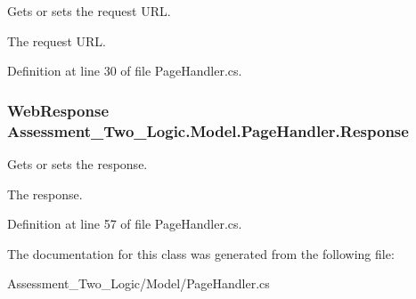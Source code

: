 Gets or sets the request URL. 

The request URL.

Definition at line 30 of file PageHandler.cs.

\hypertarget{class_assessment___two___logic_1_1_model_1_1_page_handler_af33fd9af06dc471208ceec9f6a090249}{
\subsubsection[{Response}]{\setlength{\rightskip}{0pt plus 5cm}WebResponse Assessment\_\-Two\_\-Logic.Model.PageHandler.Response}}
\label{class_assessment___two___logic_1_1_model_1_1_page_handler_af33fd9af06dc471208ceec9f6a090249}


Gets or sets the response. 

The response.

Definition at line 57 of file PageHandler.cs.



The documentation for this class was generated from the following file:\begin{DoxyCompactItemize}
\item 
Assessment\_\-Two\_\-Logic/Model/PageHandler.cs\end{DoxyCompactItemize}
